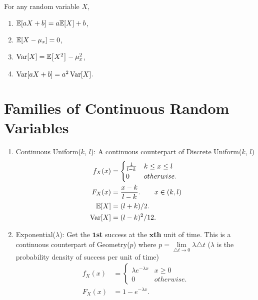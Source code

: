 \begin{theorem}
    For any random variable $X$,
    \begin{enumerate}
        \item $\E{aX+b}=a\E{X}+b$,
        \item $\E{X-\mu_x}=0$,
        \item $\Var[X] = \E{X^2}-\mu_x^2$,
        \item $\mathop{\mathrm{Var}}\nolimits[aX+b]=a^2\mathop{\mathrm{Var}}\nolimits[X]$.
    \end{enumerate}
\end{theorem}

\section{Families of Continuous Random Variables}
\begin{enumerate}
    \item Continuous Uniform($k$, $l$): A continuous counterpart of Discrete Uniform($k$, $l$){
        \begin{align*}
            f_X(x)
            &= {
                \begin{cases}
                \frac{1}{l-k} & k\leq x \leq l \\
                0             & otherwise.
                \end{cases} } \\
            F_X(x)
            &= \frac{x-k}{l-k}. \qquad x\in (k,l)\\
            \E{X}
            &= (l+k)/2. \\
            \Var[X]
            &= (l-k)^2/12. \\
        \end{align*}
    }
    \item Exponential($\lambda$): Get the $\bm{1}$\textbf{st} success at the $\bm{x}$\textbf{th} unit of time. This is a continuous counterpart of Geometry($p$) where $p=\lim\limits_{\triangle t\rightarrow 0}\lambda\triangle t$ (\ie $\lambda$ is the probability density of success per unit of time) {
        \begin{align*}
            f_X(x)
            &= {
                \begin{cases}
                    \lambda e^{-\lambda x} & x\geq 0 \\
                    0                      & otherwise.
                \end{cases}
            } \\
            F_X(x)
            &= 1-e^{-\lambda x}. \\

\end{align*}}
\end{enumerate}
